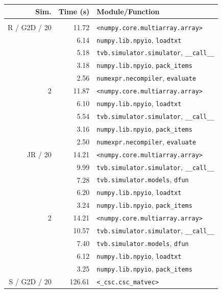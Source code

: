 \documentclass{bioinfo}
\begin{document}
	\begin{table}
	{\footnotesize \begin{tabular}{r | r | l }
	Sim. &        Time (s) &                     Module/Function \\
	\hline \\
	R / G2D / 20  &         11.72 & \texttt{<numpy.core.multiarray.array>} \\
	&          6.14 & \texttt{numpy.lib.npyio}, \texttt{loadtxt} \\
	 &         5.18 & \texttt{tvb.simulator.simulator}, \texttt{\_\_call\_\_} \\
	 &         3.18 & \texttt{numpy.lib.npyio}, \texttt{pack\_items} \\
	 &          2.56 & \texttt{numexpr.necompiler}, \texttt{evaluate} \\
	\hline
	2 &         11.87 & \texttt{<numpy.core.multiarray.array>} \\
	&         6.10 & \texttt{numpy.lib.npyio}, \texttt{loadtxt} \\
	 &         5.54 & \texttt{tvb.simulator.simulator}, \texttt{\_\_call\_\_} \\
	 &         3.16 & \texttt{numpy.lib.npyio}, \texttt{pack\_items} \\
	 &         2.50 & \texttt{numexpr.necompiler}, \texttt{evaluate} \\
	\hline
	 JR / 20  &         14.21 & \texttt{<numpy.core.multiarray.array>} \\
	&         9.99 & \texttt{tvb.simulator.simulator}, \texttt{\_\_call\_\_} \\
	 &         7.28 & \texttt{tvb.simulator.models}, \texttt{dfun} \\
	 &           6.20 & \texttt{numpy.lib.npyio}, \texttt{loadtxt} \\
	 &         3.24 & \texttt{numpy.lib.npyio}, \texttt{pack\_items} \\
	\hline
	2 &         14.21& \texttt{<numpy.core.multiarray.array>} \\
	&         10.57& \texttt{tvb.simulator.simulator}, \texttt{\_\_call\_\_} \\
	 &         7.40& \texttt{tvb.simulator.models}, \texttt{dfun} \\
	 &         6.12& \texttt{numpy.lib.npyio}, \texttt{loadtxt} \\
	 &         3.25& \texttt{numpy.lib.npyio}, \texttt{pack\_items} \\
	\hline
	S / G2D / 20 &         126.61& \texttt{<\_csc.csc\_matvec>} \\

\end{tabular}}
\end{table}
\end{document}
